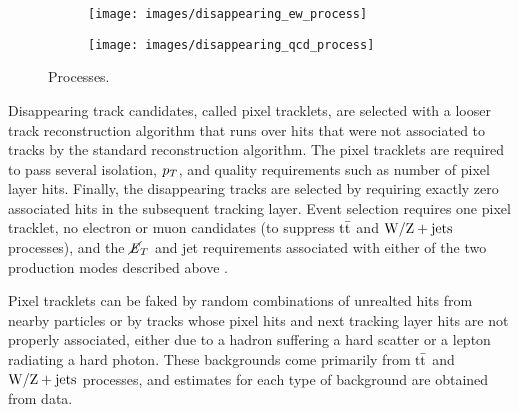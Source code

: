 \documentclass[12pt]{article}
\begin{document}
        \noindent \begin{figure}[htbp] \begin{center}
        \begin{subfigure}[htbp]{0.3\textwidth} \begin{center}
        \texttt{[image: images/disappearing\_ew\_process]}
        \end{center} \end{subfigure}
        \qquad
        \begin{subfigure}[htbp]{0.3\textwidth} \begin{center}
        \texttt{[image: images/disappearing\_qcd\_process]}
        \end{center} \end{subfigure}
        \caption{Processes.}
        \label{disappearing_processes}
        \end{center} \end{figure}

        Disappearing track candidates, called pixel tracklets, are selected with a looser track reconstruction algorithm that runs over hits that were not associated to tracks by the standard reconstruction algorithm. The pixel tracklets are required to pass several isolation, $p_T$, and quality requirements such as number of pixel layer hits. Finally, the disappearing tracks are selected by requiring exactly zero associated hits in the subsequent tracking layer. Event selection requires one pixel tracklet, no electron or muon candidates (to suppress $\mathrm{t}\bar{\mathrm{t}}$ and $\mathrm{W}/\mathrm{Z} + \mathrm{jets}$ processes), and the $\cancel{\it{E}}_{T}$ and jet requirements associated with either of the two production modes described above .
        
        Pixel tracklets can be faked by random combinations of unrealted hits from nearby particles or by tracks whose pixel hits and next tracking layer hits are not properly associated, either due to a hadron suffering a hard scatter or a lepton radiating a hard photon. These backgrounds come primarily from $\mathrm{t}\bar{\mathrm{t}}$ and $\mathrm{W}/\mathrm{Z} + \mathrm{jets}$ processes, and estimates for each type of background are obtained from data. 
\end{document}

